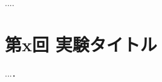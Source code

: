 \documentclass[a4j]{celb-report}
\begin{document}
....

\newpage
\section{第x回 実験タイトル}

...．

\newpage
\begin{thebibliography}{9}

\end{thebibliography}
%
\end{document}
